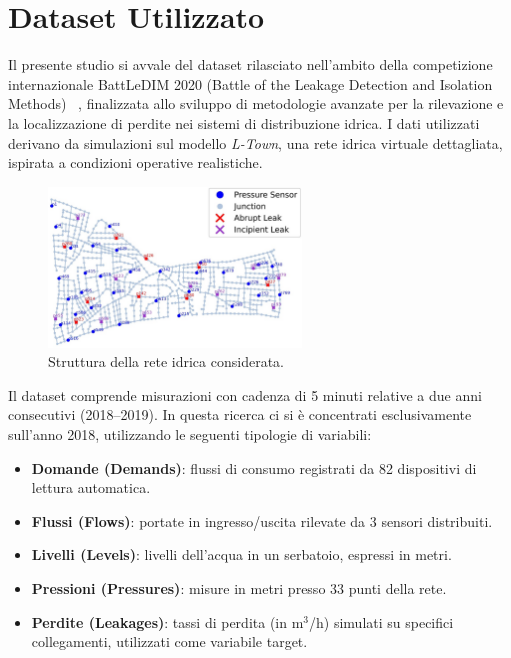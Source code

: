 \documentclass{article}
\begin{document}
\section{Dataset Utilizzato}

Il presente studio si avvale del dataset rilasciato nell'ambito della competizione internazionale 
BattLeDIM 2020 (Battle of the Leakage Detection and Isolation Methods) ~\cite{battle2020}, finalizzata allo 
sviluppo di metodologie avanzate per la rilevazione e la localizzazione di perdite nei sistemi di distribuzione 
idrica. I dati utilizzati derivano da simulazioni sul modello \emph{L-Town}, una rete idrica virtuale dettagliata, 
ispirata a condizioni operative realistiche.

\begin{figure}[htbp]
    \centering
    \includegraphics[width=0.6\textwidth]{img/struttura della rete.png}
    \caption{Struttura della rete idrica considerata.}
    \label{fig:network_structure}
\end{figure}

Il dataset comprende misurazioni con cadenza di 5 minuti relative a due anni consecutivi (2018--2019). 
In questa ricerca ci si è concentrati esclusivamente sull'anno 2018, utilizzando le seguenti tipologie 
di variabili:
\begin{itemize}
    \item \textbf{Domande (Demands)}: flussi di consumo registrati da 82 dispositivi di lettura automatica.
    \item \textbf{Flussi (Flows)}: portate in ingresso/uscita rilevate da 3 sensori distribuiti.
    \item \textbf{Livelli (Levels)}: livelli dell’acqua in un serbatoio, espressi in metri.
    \item \textbf{Pressioni (Pressures)}: misure in metri presso 33 punti della rete.
    \item \textbf{Perdite (Leakages)}: tassi di perdita (in m$^3$/h) simulati su specifici collegamenti, utilizzati come variabile target.
\end{itemize}
\end{document}
